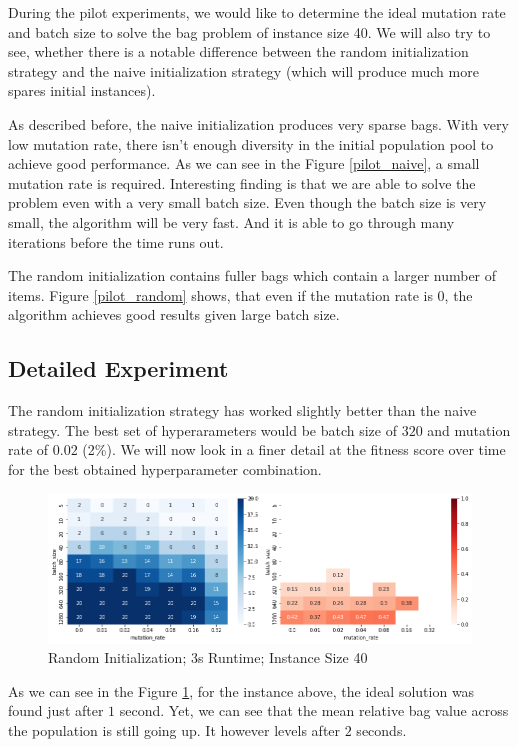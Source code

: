 \documentclass[a4paper,10pt]{article}
\begin{document}
During the pilot experiments, we would like to determine the ideal mutation rate and batch size to solve the bag problem of instance size 40. We will also try to see, whether there is a notable difference between the random initialization strategy and the naive initialization strategy (which will produce much more spares initial instances).


As described before, the naive initialization produces very sparse bags. With very low mutation rate, there isn't enough diversity in the initial population pool to achieve good performance. As we can see in the Figure \ref{pilot_naive}, a small mutation rate is required. Interesting finding is that we are able to solve the problem even with a very small batch size. Even though the batch size is very small, the algorithm will be very fast. And it is able to go through many iterations before the time runs out.

The random initialization contains fuller bags which contain a larger number of items. Figure \ref{pilot_random} shows, that even if the mutation rate is $0$, the algorithm achieves good results given large batch size. 

\subsection{Detailed Experiment}

The random initialization strategy has worked slightly better than the naive strategy. The best set of hyperarameters would be batch size of $320$ and mutation rate of $0.02$ (2\%). We will now look in a finer detail at the fitness score over time for the best obtained hyperparameter combination.

\begin{figure}[!htb]
	\centering
  	\includegraphics[width=\textwidth]{images/pilot_counts_means.png}
	\caption{Random Initialization; 3s Runtime; Instance Size 40}
	\label{detail}
\end{figure}

As we can see in the Figure \ref{detail}, for the instance above, the ideal solution was found just after $1$ second. Yet, we can see that the mean relative bag value across the population is still going up. It however levels after $2$ seconds.
\end{document}

